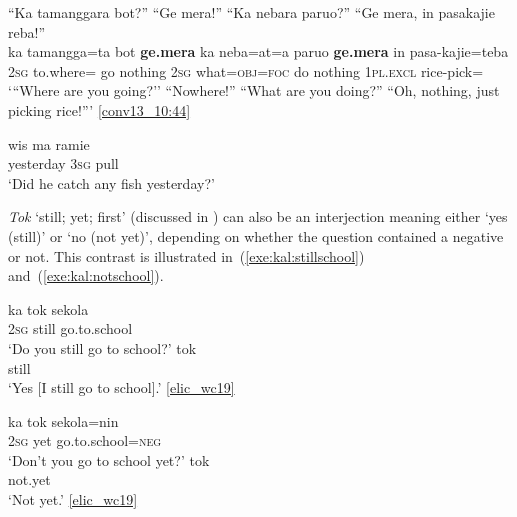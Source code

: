 \documentclass[output=paper,colorlinks,citecolor=brown,draft]{langscibook}
\begin{document}
\ea 	\label{exe:kal:gemera}
\glll ``Ka tamanggara bot?'' {``Ge mera!''} ``Ka nebara paruo?'' ``{Ge mera}, in pasakajie reba!''\\
ka tamangga=ta bot \textbf{ge.mera} ka neba=at=a paruo \textbf{ge.mera} in pasa-kajie=teba\\
\textsc{2sg} to.where={\glta} go nothing \textsc{2sg} what=\textsc{obj=foc} do nothing \textsc{1pl.excl} rice-pick=\glteba\\
\glt	`{``}Where are you going?'' ``Nowhere!'' ``What are you doing?'' ``Oh, nothing, just picking rice!''' {\href{http://hdl.handle.net/10050/00-0000-0000-0004-1BA6-6}{[conv13\_10:44]}}
\z

\ea	\label{exe:kal:ramie}
\begin{xlist}
 	{\label{exe:kal:wis}
	\gll wis ma ramie\\
	yesterday \textsc{3sg} pull\\
	\glt	`Did he catch any fish yesterday?'
}

\end{xlist}
\z

\textit{Tok} `still; yet; first' (discussed in ) can also be an interjection meaning either `yes (still)' or `no (not yet)', depending on whether the question contained a negative or not. This contrast is illustrated in~(\ref{exe:kal:stillschool}) and~(\ref{exe:kal:notschool}).

\ea \label{exe:kal:stillschool}
\begin{xlist}
		{\gll ka tok sekola\\
			\textsc{2sg} still go.to.school\\
			\glt `Do you still go to school?' }
		{\gll tok\\
			still\\
			\glt `Yes [I still go to school].' {\href{http://hdl.handle.net/10050/00-0000-0000-0004-1C60-A}{[elic\_wc19]}}}
\end{xlist}		
\z 
		
\ea	\label{exe:kal:notschool}	
\begin{xlist}
		{\gll ka tok sekola=nin\\
			\textsc{2sg} yet go.to.school=\textsc{neg}\\
			\glt `Don't you go to school yet?' }
		{\gll tok\\
			not.yet\\
		\glt `Not yet.' {\href{http://hdl.handle.net/10050/00-0000-0000-0004-1C60-A}{[elic\_wc19]}}}
\end{xlist}
\z
\end{document}
